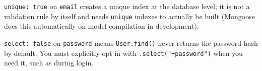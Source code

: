 \begin{notebox}[NOTE]
\texttt{unique: true} on \texttt{email} creates a unique index at the database level; it is not a validation rule by itself and needs \texttt{unique} indexes to actually be built (Mongoose does this automatically on model compilation in development).
\end{notebox}

\begin{tipbox}[TIP]
\texttt{select: false} on \texttt{password} means \texttt{User.find()} never returns the password hash by default. You must explicitly opt in with \texttt{.select("+password")} when you need it, such as during login.
\end{tipbox}
